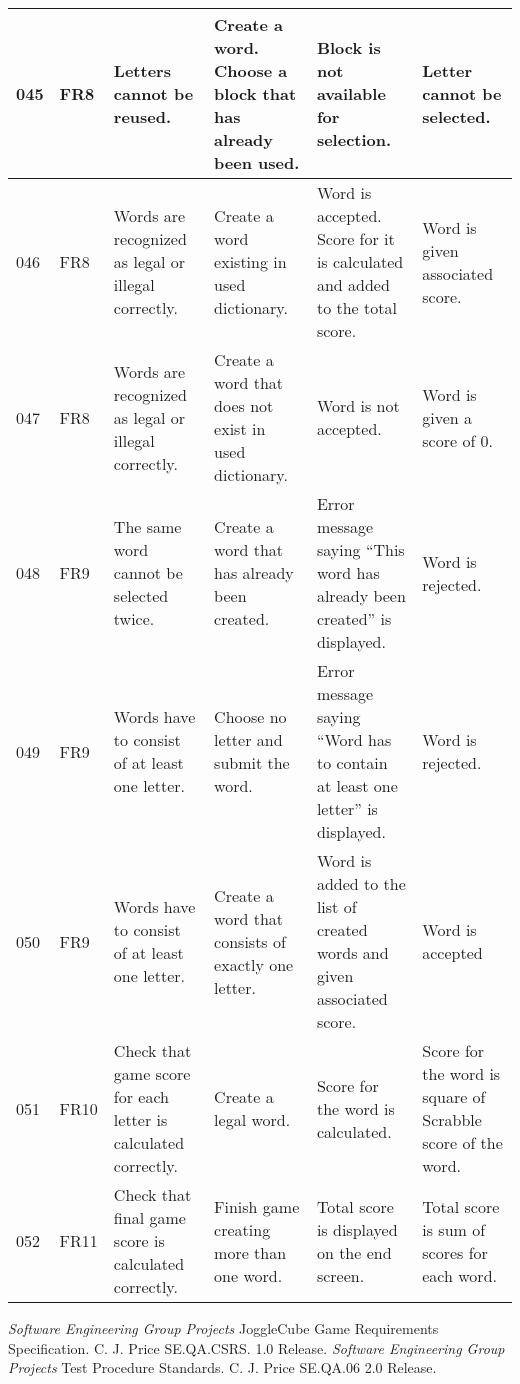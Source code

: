 \documentclass{project}
\begin{document}
\begin{tabular}{|p{0.7cm}|p{1cm}|p{3.5cm}|p{3.2cm}|p{3.5cm}|p{3.5cm}|}
045 & FR8 & Letters cannot be reused. & Create a word. Choose a block that has already been used. 
& Block is not available for selection. & Letter cannot be selected. \\ \hline

046 & FR8 & Words are recognized as legal or illegal correctly. & Create a word existing in used dictionary. 
& Word is accepted. Score for it is calculated and added to the total score. & Word is given associated score. \\ \hline

047 & FR8 & Words are recognized as legal or illegal correctly. & Create a word that does not exist in used dictionary.
& Word is not accepted. & Word is given a score of 0. \\ \hline

048 & FR9 & The same word cannot be selected twice. & Create a word that has already been created. 
& Error message saying “This word has already been created” is displayed.  & Word is rejected. \\ \hline

049 & FR9 & Words have to consist of at least one letter. & Choose no letter and submit the word.
& Error message saying “Word has to contain at least one letter” is displayed. & Word is rejected. \\ \hline

050 & FR9 & Words have to consist of at least one letter. & Create a word that consists of exactly one letter.
& Word is added to the list of created words and given associated score. & Word is accepted \\ \hline

051 & FR10 & Check that game score for each letter is calculated correctly. & Create a legal word. 
& Score for the word is calculated. & Score for the word is square of Scrabble score of the word. \\ \hline

052 & FR11 & Check that final game score is calculated correctly. & Finish game creating more than one word.
& Total score is displayed on the end screen. & Total score is sum of scores for each word. \\ \hline

\end{tabular}

\clearpage
{}
\begin{thebibliography}{5}
 \emph{Software Engineering Group Projects}
JoggleCube Game Requirements Specification.
C. J. Price SE.QA.CSRS. 1.0 Release.
 \emph{Software Engineering Group Projects}
Test Procedure Standards.
C. J. Price SE.QA.06 2.0 Release.
\end{thebibliography}
\clearpage
{}
\end{document}
